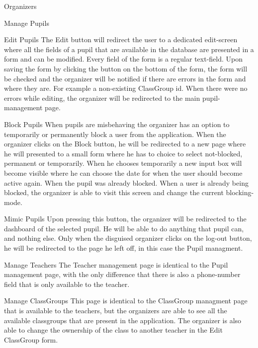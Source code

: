 \begin{section}{Organizers}
\begin{subsection}{Manage Pupils}
		\begin{subsubsection}{Edit Pupils}
			\label{sec:organizer_edit_pupils}
			The Edit button will redirect the user to a dedicated edit-screen where all
			the fields of a pupil that are available in the database are presented in a
			form and can be modified. Every field of the form is a regular text-field.
			Upon saving the form by clicking the button on the bottom of the form, the
			form will be checked and the organizer will be notified if there are errors
			in the form and where they are. For example a non-existing ClassGroup id.
			When there were no errors while editing, the organizer will be redirected to
			the main pupil-management page.
		\end{subsubsection}
		\begin{subsubsection}{Block Pupils}
			When pupils are misbehaving the organizer has an option to temporarily or
			permanently block a user from the application. When the organizer clicks on
			the Block button, he will be redirected to a new page where he will presented
			to a small form where he has to choice to select not-blocked, permanent or
			temporarily. When he chooses temporarily a new input box will become visible
			where he can choose the date for when the user should become active again.
			When the pupil was already blocked. When a user is already being blocked,
			the organizer is able to visit this screen and change the current
			blocking-mode.
		\end{subsubsection}
		\begin{subsubsection}{Mimic Pupils}
			Upon pressing this button, the organizer will be redirected to the dashboard
			of the selected pupil. He will be able to do anything that pupil can, and
			nothing else. Only when the disguised organizer clicks on the log-out button,
			he will be redirected to the page he left off, in this case the Pupil
			managment.
		\end{subsubsection}
		
	\end{subsection}
	
	\begin{subsection}{Manage Teachers}
		The Teacher management page is identical to the Pupil management page, with the
		only difference that there is also a phone-number field that is only available
		to the teacher.
	\end{subsection}
	
	\begin{subsection}{Manage ClassGroups}
		This page is identical to the ClassGroup managment page that is available to the
		teachers, but the organizers are able to see all the available classgroups that
		are present in the application. The organizer is also able to change the ownership
		of the class to another teacher in the Edit ClassGroup form.
	\end{subsection}
	

\end{section}
